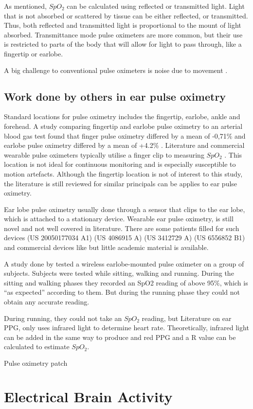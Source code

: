 \medskip
As mentioned, $SpO_2$ can be calculated using reflected or transmitted light. Light that is not absorbed or scattered by tissue can be either reflected, or transmitted. Thus, both reflected and transmitted light is proportional to the mount of light absorbed. Transmittance mode pulse oximeters are more common, but their use is restricted to parts of the body that will allow for light to pass through, like a fingertip or earlobe.

\medskip
A big challenge to conventional pulse oximeters is noise due to movement \citep{spo2Motion}.

\subsection{Work done by others in ear pulse oximetry}
Standard locations for pulse oximetry includes the fingertip, earlobe, ankle and forehead. A study comparing fingertip and earlobe pulse oximetry to an arterial blood gas test found that finger pulse oximetry differed by a mean of -0,71\% and earlobe pulse oximetry differed by a mean of +4.2\% \citep{olive2016comparison}. Literature and commercial wearable pulse oximeters typically utilise a finger clip to measuring $SpO_2$ \citep{watthanawisuth2010wireless} \citep{pujary2003photodetector} \citep{huang2014novel} \citep{khalifa2014development}. This location is not ideal for continuous monitoring and is especially susceptible to motion artefacts. Although the fingertip location is not of interest to this study, the literature is still reviewed for similar principals can be applies to ear pulse oximetry.

\medskip
Ear lobe pulse oximetry usually done through a sensor that clips to the ear lobe, which is attached to a stationary device. Wearable ear pulse oximetry, is still novel and not well covered in literature. There are some patients filled for such devices (US 20050177034 A1) (US 4086915 A) (US 3412729 A) (US 6556852 B1) and commercial devices like but little academic material is available.

\medskip
A study done by \citep{aziz2006pervasive} tested a wireless earlobe-mounted pulse oximeter on a group of subjects. Subjects were tested while sitting, walking and running. During the sitting and walking phases they recorded an SpO2 reading of above 95\%, which is \enquote{as expected} according to them. But during the running phase they could not obtain any accurate reading. 

\medskip
During running, they could not take an $SpO_2$ reading, but Literature on ear PPG, only uses infrared light to determine heart rate. Theoretically, infrared light can be added in the same way to produce and red PPG and a R value can be calculated to estimate $SpO_2$.

\medskip
Pulse oximetry patch

\section{Electrical Brain Activity}
